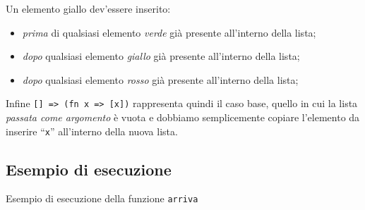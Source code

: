 Un elemento giallo dev'essere inserito:

\begin{itemize}
	\item \emph{prima} di qualsiasi elemento \emph{verde} già presente all'interno della lista;
	\item \emph{dopo} qualsiasi elemento \emph{giallo} già presente all'interno della lista;
	\item \emph{dopo} qualsiasi elemento \emph{rosso} già presente all'interno della lista;
\end{itemize}

Infine \texttt{[] => (fn x => [x])} rappresenta quindi il caso base, quello in cui la lista \emph{passata come argomento} è vuota e dobbiamo semplicemente copiare l'elemento da inserire ``\texttt{x}'' all'interno della nuova lista.

\subsection*{Esempio di esecuzione}

\begin{listing}[!h]
\caption[]{Esempio di esecuzione della funzione \texttt{arriva}}
\end{listing}
